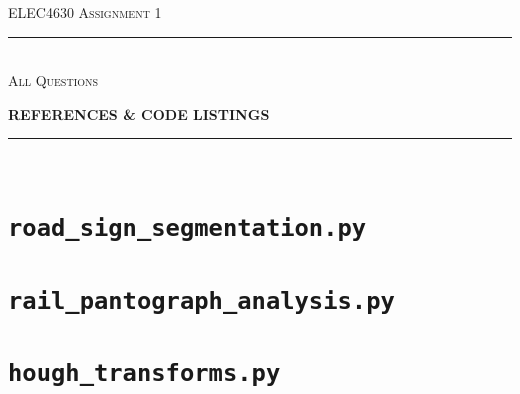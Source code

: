 \begin{titlepage}
  \centering

  \textsc{ELEC4630 Assignment 1}\\
  \vspace{9cm}

  \rule{\linewidth}{0.5pt}\\

  \vspace{1em}
  \LARGE\textsc{All Questions}\\
  \vspace{1em}

  \LARGE\uppercase{\textbf{{References \& Code Listings}}}\\

  \rule{\linewidth}{2pt}\\

  \vfill

\end{titlepage}

\printbibliography

\appendix

\newpage
\section{\texttt{road\_sign\_segmentation.py}}


\newpage
\section{\texttt{rail\_pantograph\_analysis.py}}


\newpage
\section{\texttt{hough\_transforms.py}}
